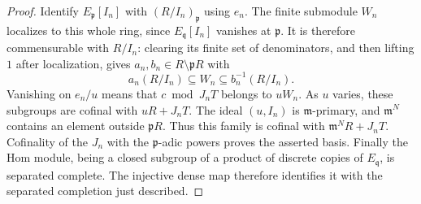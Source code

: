 \begin{proof}
Identify $E_{\mathfrak p}[I_n]$ with $(R/I_n)_{\mathfrak p}$
using $e_n$. The finite submodule $W_n$ localizes to this whole
ring, since $E_{\mathfrak q}[I_n]$ vanishes at $\mathfrak p$.
It is therefore commensurable with $R/I_n$: clearing its finite
set of denominators, and then lifting $1$ after localization,
gives $a_n,b_n\in R\setminus\mathfrak pR$ with
\[
 a_n(R/I_n)\subseteq W_n\subseteq b_n^{-1}(R/I_n).
\]
Vanishing on $e_n/u$ means that $c\bmod J_nT$ belongs to
$uW_n$. As $u$ varies, these subgroups are cofinal with
$uR+J_nT$. The ideal $(u,I_n)$ is $\mathfrak m$-primary, and
$\mathfrak m^N$ contains an element outside $\mathfrak pR$.
Thus this family is cofinal with
$\mathfrak m^N R+J_nT$. Cofinality of the $J_n$ with the
$\mathfrak p$-adic powers proves the asserted basis.
Finally the Hom module, being a closed subgroup of a product of
discrete copies of $E_{\mathfrak q}$, is separated complete.
The injective dense map therefore identifies it with the separated
completion just described.
\end{proof}

